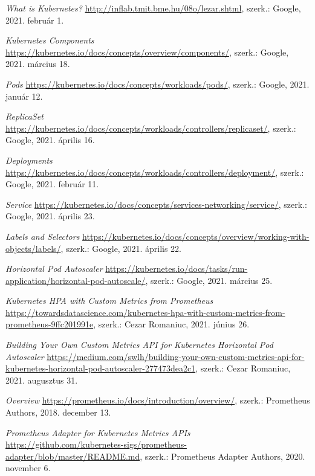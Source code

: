\documentclass[a4paper,oneside]{article}
\begin{document}
\begin{thebibliography}{9}
\label{sec:tanulm-irod-jegyz}

 \emph{What is Kubernetes?}
  \url{http://inflab.tmit.bme.hu/08o/lezar.shtml}, szerk.: Google,
  2021. február 1.

 \emph{Kubernetes Components}
  \url{https://kubernetes.io/docs/concepts/overview/components/}, szerk.: Google,
  2021. március 18.

 \emph{Pods}
  \url{https://kubernetes.io/docs/concepts/workloads/pods/}, szerk.: Google,
  2021. január 12.

 \emph{ReplicaSet}
  \url{https://kubernetes.io/docs/concepts/workloads/controllers/replicaset/}, szerk.: Google,
  2021. április 16.

 \emph{Deployments}
  \url{https://kubernetes.io/docs/concepts/workloads/controllers/deployment/}, szerk.: Google,
  2021. február 11.

 \emph{Service}
  \url{https://kubernetes.io/docs/concepts/services-networking/service/}, szerk.: Google,
  2021. április 23.

 \emph{Labels and Selectors}
  \url{https://kubernetes.io/docs/concepts/overview/working-with-objects/labels/}, szerk.: Google,
  2021. április 22.

 \emph{Horizontal Pod Autoscaler}
  \url{https://kubernetes.io/docs/tasks/run-application/horizontal-pod-autoscale/}, szerk.: Google,
  2021. március 25.

 \emph{Kubernetes HPA with Custom Metrics from Prometheus}
  \url{https://towardsdatascience.com/kubernetes-hpa-with-custom-metrics-from-prometheus-9ffc201991e}, szerk.: Cezar Romaniuc,
  2021. június 26.
  
 \emph{Building Your Own Custom Metrics API for Kubernetes Horizontal Pod Autoscaler}
  \url{https://medium.com/swlh/building-your-own-custom-metrics-api-for-kubernetes-horizontal-pod-autoscaler-277473dea2c1}, szerk.: Cezar Romaniuc,
  2021. augusztus 31.

 \emph{Overview}
  \url{https://prometheus.io/docs/introduction/overview/}, szerk.:  Prometheus Authors,
  2018. december 13.

 \emph{Prometheus Adapter for Kubernetes Metrics APIs}
  \url{https://github.com/kubernetes-sigs/prometheus-adapter/blob/master/README.md}, szerk.:  Prometheus Adapter Authors,
  2020. november 6.


\end{thebibliography}
\end{document}
